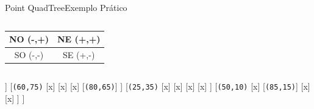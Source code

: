 \documentclass[red, tikz, aspectratio=169, xcolor=dvipsnames]{beamer}
\begin{document}
			\begin{frame}[fragile]{Point QuadTree}{Exemplo Prático}
				\centering
				\vspace{-40px}
				\begin{columns}
					\begin{column}{0.48\textwidth}
						\centering
						\begin{tabular}{|c|c|}
							\hline 
							NO (-,+) & NE (+,+) \\ 
							\hline 
							SO (-,-) & SE (+,-) \\ 
							\hline 
						\end{tabular} 
					\end{column}
					\begin{column}{0.5\textwidth}
						\centering
						\fbox{
							\begin{forest}
								[\texttt{(x,y)}
								[NO]
								[NE]
								[SO]
								[SE]
								]
						\end{forest}}
					\end{column}
				\end{columns}
				\vspace{10px}
				
				\vspace{10px}
				
				\begin{minipage}{\textwidth}
					\centering
					
					\begin{forest}
						[\texttt{(35,40)}
						[\texttt{(05,45)}
						[x]
						[x]
						[x]
						[x]
						]
						[\texttt{(60,75)}
						[x]
						[x]
						[x]
						[\texttt{(80,65)}]
						]
						[\texttt{(25,35)}
						[x]
						[x]
						[x]
						[x]
						]
						[\texttt{(50,10)}
						[x]
						[\texttt{(85,15)}]
						[x]
						[x]
						]
						]
					\end{forest}
				\end{minipage}
			\end{frame}
			
\end{document}

